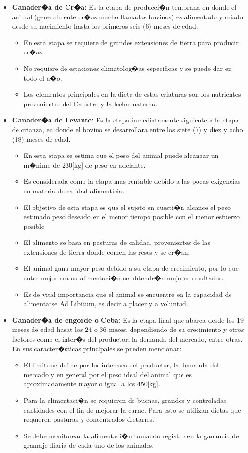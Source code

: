 \begin{itemize}
	\item \textbf{Ganader�a de Cr�a:} Es la etapa de producci�n temprana en donde el animal (generalmente cr�as macho llamadas bovinos) es alimentado y criado desde su nacimiento hasta los primeros seis (6) meses de edad. 
	\begin{itemize}
		\item En esta etapa se requiere de grandes extensiones de tierra para producir cr�as
		\item No requiere de estaciones climatolog�as especificas y se puede dar en todo el a�o.
		\item Los elementos principales en la dieta de estas criaturas son los nutrientes provenientes del 					  Calostro y la leche materna.
	\end{itemize} 
	\item \textbf{Ganader�a de Levante:} Es la etapa inmediatamente siguiente a la etapa de crianza, en donde el bovino se desarrollara entre los siete (7) y diez y ocho (18) meses de edad.
	\begin{itemize}
		\item En esta etapa se estima que el peso del animal puede alcanzar un m�nimo de 230[kg] de peso en adelante.
		\item Es considerada como la etapa mas  rentable debido a las  pocas exigencias en materia de calidad alimenticia. 
		\item El objetivo de esta etapa es que el sujeto en cuesti�n alcance el peso estimado peso deseado en el menor tiempo posible con el menor esfuerzo posible
		\item El alimento se basa en pasturas de calidad, provenientes de las extensiones de tierra donde comen las reses y se cr�an.
		\item El animal gana mayor peso debido a su etapa de crecimiento, por lo que entre mejor sea su alimentaci�n se obtendr�n mejores resultados.
		\item Es de vital importancia que el animal se encuentre en la capacidad de  alimentarse Ad Libitum, es decir a placer y a voluntad.
	\end{itemize} 
	\item \textbf{Ganader�a de engorde o Ceba:} Es la etapa final que abarca desde los 19 meses de edad hasat los 24 o 36 meses, dependiendo de su crecimiento  y otros factores como el inter�s del productor, la demanda del mercado, entre otras. En sus caracter�sticas principales se pueden mencionar:
	\begin{itemize}
		\item El limite se define por los intereses del productor, la demanda del mercado y en general por el peso ideal del animal que es aproximadamente mayor o igual a los 450[kg].
		\item Para la alimentaci�n se requieren de buenas, grandes y controladas cantidades con el fin de mejorar la carne. Para esto se utilizan dietas que requieren pasturas y concentrados dietarios.
		\item Se debe monitorear la alimentaci�n tomando registro en la ganancia de gramaje diaria de cada uno de los animales.
	\end{itemize}
\end{itemize} 
